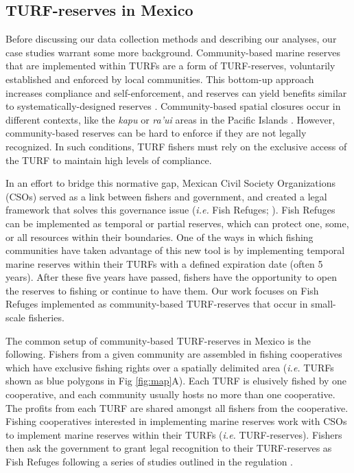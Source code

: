 \documentclass{frontiersSCNS}
\begin{document}
\hypertarget{turf-reserves-in-mexico}{%
\subsection{TURF-reserves in Mexico}\label{turf-reserves-in-mexico}}

Before discussing our data collection methods and describing our
analyses, our case studies warrant some more background. Community-based
marine reserves that are implemented within TURFs are a form of
TURF-reserves, voluntarily established and enforced by local
communities. This bottom-up approach increases compliance and
self-enforcement, and reserves can yield benefits similar to
systematically-designed reserves \citep{beger_2004,smallhornwest_2018}.
Community-based spatial closures occur in different contexts, like the
\emph{kapu} or \emph{ra'ui} areas in the Pacific Islands
\citep{bohnsack_2004,johannes_2002}. However, community-based reserves
can be hard to enforce if they are not legally recognized. In such
conditions, TURF fishers must rely on the exclusive access of the TURF
to maintain high levels of compliance.

In an effort to bridge this normative gap, Mexican Civil Society
Organizations (CSOs) served as a link between fishers and government,
and created a legal framework that solves this governance issue
(\emph{i.e.} Fish Refuges; \citet{nom}). Fish Refuges can be implemented
as temporal or partial reserves, which can protect one, some, or all
resources within their boundaries. One of the ways in which fishing
communities have taken advantage of this new tool is by implementing
temporal marine reserves within their TURFs with a defined expiration
date (often 5 years). After these five years have passed, fishers have
the opportunity to open the reserves to fishing or continue to have
them. Our work focuses on Fish Refuges implemented as community-based
TURF-reserves that occur in small-scale fisheries.

The common setup of community-based TURF-reserves in Mexico is the
following. Fishers from a given community are assembled in fishing
cooperatives which have exclusive fishing rights over a spatially
delimited area (\emph{i.e.} TURFs shown as blue polygons in Fig
\ref{fig:map}A). Each TURF is elusively fished by one cooperative, and
each community usually hosts no more than one cooperative. The profits
from each TURF are shared amongst all fishers from the cooperative.
Fishing cooperatives interested in implementing marine reserves work
with CSOs to implement marine reserves within their TURFs (\emph{i.e.}
TURF-reserves). Fishers then ask the government to grant legal
recognition to their TURF-reserves as Fish Refuges following a series of
studies outlined in the regulation \citep{nom}.
\end{document}
